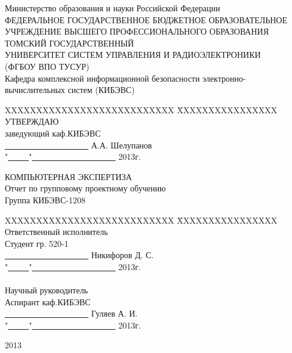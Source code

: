 \documentclass[russian,utf8,14pt,simple]{eskdtext}
\begin{document}
\newpage
{}

\begin{center}
Министерство образования и науки Российской Федерации\\
ФЕДЕРАЛЬНОЕ ГОСУДАРСТВЕННОЕ БЮДЖЕТНОЕ ОБРАЗОВАТЕЛЬНОЕ\\
УЧРЕЖДЕНИЕ ВЫСШЕГО ПРОФЕССИОНАЛЬНОГО ОБРАЗОВАНИЯ\\
ТОМСКИЙ ГОСУДАРСТВЕННЫЙ\\
УНИВЕРСИТЕТ СИСТЕМ УПРАВЛЕНИЯ И РАДИОЭЛЕКТРОНИКИ\\
(ФГБОУ ВПО ТУСУР)\\
Кафедра комплексной информационной безопасности электронно-вычислительных систем (КИБЭВС)\\
\end{center}

\begin{tabbing}
XXXXXXXXXXXXXXXXXXXXXXXXXXX \=
XXXXXXXXXXXXXXXX\kill
\> УТВЕРЖДАЮ\\
\> заведующий каф.КИБЭВС\\
\> \underline{\ \ \ \ \ \ \ \ \ \ \ \ \ \ \ \ \ \ \ \ } А.А. Шелупанов\\
\> "\underline{\ \ \ \ \ }"\underline{\ \ \ \ \ \ \ \ \ \ \ \ \ \ \ \ \ \ \ \ } 2013г.\\
\end{tabbing}

\begin{center}
КОМПЬЮТЕРНАЯ ЭКСПЕРТИЗА\\
Отчет по групповому проектному обучению\\
Группа КИБЭВС-1208\\
\end{center}

\begin{tabbing}
XXXXXXXXXXXXXXXXXXXXXXXXXXX \=
XXXXXXXXXXXXXXXX\kill
\> Ответственный исполнитель\\
\> Студент гр. 520-1\\
\> \underline{\ \ \ \ \ \ \ \ \ \ \ \ \ \ \ \ \ \ \ \ } Никифоров Д. С.\\
\> "\underline{\ \ \ \ \ }"\underline{\ \ \ \ \ \ \ \ \ \ \ \ \ \ \ \ \ \ \ \ } 2013г.\\
\ \\
\> Научный руководитель\\
\> Аспирант каф.КИБЭВС\\
\> \underline{\ \ \ \ \ \ \ \ \ \ \ \ \ \ \ \ \ \ \ \ } Гуляев А. И.\\
\> "\underline{\ \ \ \ \ }"\underline{\ \ \ \ \ \ \ \ \ \ \ \ \ \ \ \ \ \ \ \ } 2013г.\\
\end{tabbing}
\vfill
\begin{center}
2013
\end{center}
\end{document}
